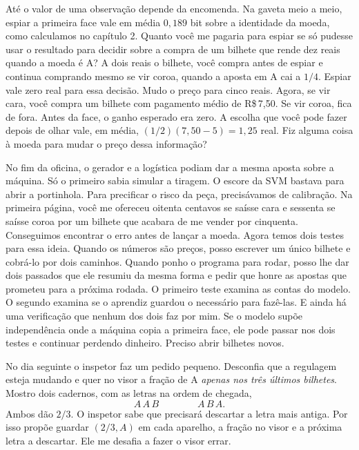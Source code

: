 Até o valor de uma observação depende da encomenda. Na gaveta meio a meio, espiar a primeira face vale em média $0{,}189$ bit sobre a identidade da moeda, como calculamos no capítulo 2. Quanto você me pagaria para espiar se só pudesse usar o resultado para decidir sobre a compra de um bilhete que rende dez reais quando a moeda é A? A dois reais o bilhete, você compra antes de espiar e continua comprando mesmo se vir coroa, quando a aposta em A cai a $1/4$. Espiar vale zero real para essa decisão. Mudo o preço para cinco reais. Agora, se vir cara, você compra um bilhete com pagamento médio de R\$\,7,50. Se vir coroa, fica de fora. Antes da face, o ganho esperado era zero. A escolha que você pode fazer depois de olhar vale, em média, $(1/2)(7{,}50-5)=1{,}25$ real. Fiz alguma coisa à moeda para mudar o preço dessa informação?

No fim da oficina, o gerador e a logística podiam dar a mesma aposta sobre a máquina. Só o primeiro sabia simular a tiragem. O escore da SVM bastava para abrir a portinhola. Para precificar o risco da peça, precisávamos de calibração. Na primeira página, você me ofereceu oitenta centavos se saísse cara e sessenta se saísse coroa por um bilhete que acabara de me vender por cinquenta. Conseguimos encontrar o erro antes de lançar a moeda. Agora temos dois testes para essa ideia. Quando os números são preços, posso escrever um único bilhete e cobrá-lo por dois caminhos. Quando ponho o programa para rodar, posso lhe dar dois passados que ele resumiu da mesma forma e pedir que honre as apostas que prometeu para a próxima rodada. O primeiro teste examina as contas do modelo. O segundo examina se o aprendiz guardou o necessário para fazê-las. E ainda há uma verificação que nenhum dos dois faz por mim. Se o modelo supõe independência onde a máquina copia a primeira face, ele pode passar nos dois testes e continuar perdendo dinheiro. Preciso abrir bilhetes novos.

No dia seguinte o inspetor faz um pedido pequeno. Desconfia que a regulagem esteja mudando e quer no visor a fração de A \emph{apenas nos três últimos bilhetes}. Mostro dois cadernos, com as letras na ordem de chegada,
\[
                           A\,A\,B \qquad\qquad A\,B\,A .
\]
Ambos dão $2/3$. O inspetor sabe que precisará descartar a letra mais antiga. Por isso propõe guardar $(2/3,A)$ em cada aparelho, a fração no visor e a próxima letra a descartar. Ele me desafia a fazer o visor errar.

